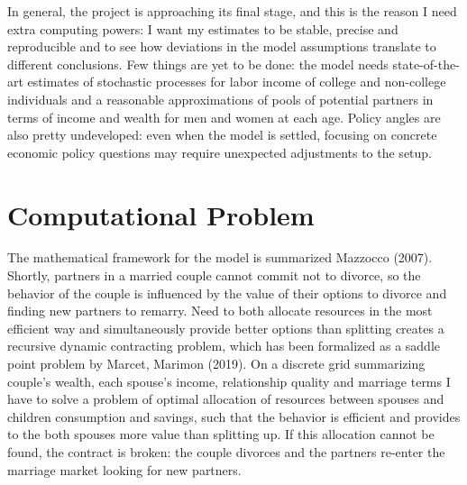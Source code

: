 \documentclass[11pt,letter]{article}
\begin{document}
In general, the project is approaching its final stage, and this is the reason I need extra computing powers: I want my estimates to be stable, precise and reproducible and to see how deviations in the model assumptions translate to different conclusions. Few things are yet to be done: the model needs state-of-the-art estimates of stochastic processes for labor income of college and non-college individuals and a reasonable approximations of pools of potential partners in terms of income and wealth for men and women at each age. Policy angles are also pretty undeveloped: even when the model is settled, focusing on concrete economic policy questions may require unexpected adjustments to the setup.

\section{Computational Problem}

The mathematical framework for the model is summarized \nocite{mazzocco}Mazzocco (2007). Shortly, partners in a married couple cannot commit not to divorce, so the behavior of the couple is influenced by the value of their options to divorce and finding new partners to remarry. Need to both allocate resources in the most efficient way and simultaneously provide better options than splitting creates a recursive dynamic contracting problem, which has been formalized as a saddle point problem by \nocite{marcetmarimon}Marcet, Marimon (2019). On a discrete grid summarizing couple's wealth, each spouse's income, relationship quality and marriage terms I have to solve a problem of optimal allocation of resources between spouses and children consumption and savings, such that the behavior is efficient and provides to the both spouses more value than splitting up. If this allocation cannot be found, the contract is broken: the couple divorces and the partners re-enter the marriage market looking for new partners.
\end{document}
